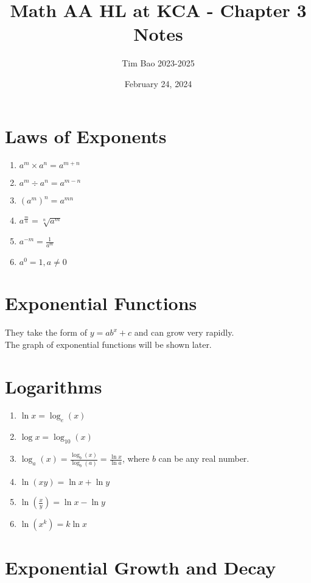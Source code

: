 \documentclass[11pt]{article}
\title{Math AA HL at KCA - Chapter 3 Notes}
\author{Tim Bao 2023-2025}
\date{February 24, 2024}
\newcommand{\lb}{\\[8pt]}
\begin{document}
\maketitle
\pagebreak

\section{Laws of Exponents}

\begin{enumerate}
  \item $a^m \times a^n = a^{m + n}$
  \item $a^m \div a^n = a^{m - n}$
  \item $(a^m)^n = a^{mn}$
  \item $a^\frac{m}{n} = \sqrt[n]{a^m}$
  \item $a^{-m} = \frac{1}{a^m}$
  \item $a^0 = 1, a \not = 0$
\end{enumerate}

\section{Exponential Functions}

They take the form of $y = ab^x + c$ and can grow very rapidly.\lb
The graph of exponential functions will be shown later.

\section{Logarithms}

\begin{enumerate}
  \item $\ln x = \log_e(x)$
  \item $\log x = \log_{10}(x)$
  \item $\log_a(x) = \frac{\log_b(x)}{\log_b(a)} = \frac{\ln x}{\ln a}$, where $b$ can be any real number.
  \item $\ln (xy) = \ln x + \ln y$
  \item $\ln (\frac{x}{y}) = \ln x - \ln y$
  \item $\ln (x^k) = k\ln x$
\end{enumerate}

\pagebreak

\section{Exponential Growth and Decay}
\end{document}
